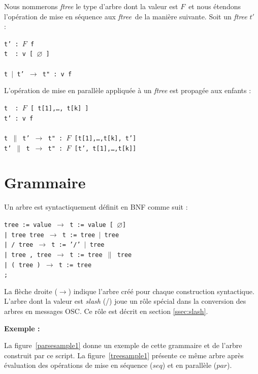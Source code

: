 \documentclass{article}
\newcommand{\exemple}	{\vspace*{1mm}\hspace*{-4mm}\textbf{Exemple :}}
\newcommand{\code}	[2][0.9]		{\vspace{0mm}\begin{center}\colorbox{mygrey}{
							\begin{minipage}[t]{#1\columnwidth} 
							{\small \texttt{#2}}
							\end{minipage}}\end{center}}
\newcommand{\op}	[1]		{\vspace{0mm}\begin{center}\colorbox{mygrey}{
							\begin{minipage}[t]{0.9\columnwidth} 
							{\small \texttt{#1}}
							\end{minipage}}\end{center}}
\newcommand{\nulltree}	{\ensuremath{\varnothing}}
\newcommand{\seq}		{\ensuremath{|}}
\newcommand{\paral}		{\ensuremath{\parallel}}
\newcommand{\foret}		{\ensuremath{F}}
\newcommand{\ftree}		{ftree}
\newcommand{\etc}		{…}
\newcommand{\ula}		{\hspace*{8mm}}
\begin{document}
Nous nommerons \emph{\ftree} le type d'arbre dont la valeur est \foret\ et nous étendons l'opération de mise en séquence aux \emph{\ftree}\ de la manière suivante. Soit un \emph{\ftree} $t'$~ :
\op{t' :  \foret\ f\\
t \ :  v [ \nulltree\ ]\\
\\
t \seq\ t'  $\to$  t" : v f
}

L'opération de mise en parallèle appliquée à un \emph{\ftree} est propagée aux enfants : 
\op{t \ : \foret\ [ t[1],\etc, t[k] ]\\
t' : v f\\
\\
t \paral\ t'  $\to$  t" : \foret\ [t[1],\etc,t[k], t']\\
t' \paral\ t  $\to$  t" : \foret\ [t', t[1],\etc,t[k]]
}



\section{Grammaire}\label{agram}

Un arbre est syntactiquement définit en BNF comme suit :
\code{tree := value      \hspace*{8mm} $\to$ t := value [ \nulltree ] \\
\ula | tree tree         \hspace*{4mm} $\to$ t := tree \seq\ tree \\
\ula | / tree            \hspace*{9.7mm} $\to$ t := '/' \seq\ tree\\
\ula | tree , tree       \hspace*{0mm}  $\to$ t := tree \paral\ tree \\
\ula | ( tree )          \hspace*{6mm} $\to$ t := tree \\
\ula ;\\
}
La flèche droite ($\to$) indique l'arbre créé pour chaque construction syntactique. 
L'arbre dont la valeur est \emph{slash} (/) joue un rôle spécial dans la conversion des arbres en messages OSC. Ce rôle est décrit en section \ref{ssec:slash}.


\exemple

La figure~\ref{parsesample1} donne un exemple de cette grammaire et de l'arbre construit par ce script. La figure~\ref{treesample1} présente ce même arbre après évaluation des opérations de mise en séquence ($seq$) et en parallèle ($par$).
\end{document}
